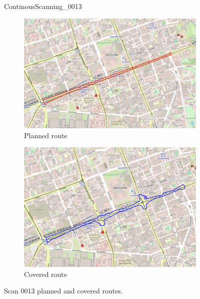 \documentclass[a4paper,12pt]{book}
\begin{document}
\begin{enumerate}
\begin{figure}[H]
		\caption{ContinousScanning\_0013}
	\end{figure}
	\begin{figure}[H]
		\centering
		\begin{subfigure}{.90\textwidth}
			\centering
			\includegraphics[width=1\linewidth]{route_p13}
			\caption{Planned route}
			\label{fig:a13}
		\end{subfigure}%
		\linebreak
		\begin{subfigure}{.90\textwidth}
			\centering
			\includegraphics[width=1\linewidth]{route_c13}
			\caption{Covered route}
			\label{fig:b13}
		\end{subfigure}
		\caption{Scan 0013 planned and covered routes.}
		\label{fig:fig13}
	\end{figure}
	\pagebreak
	

\end{enumerate}
\end{document}
